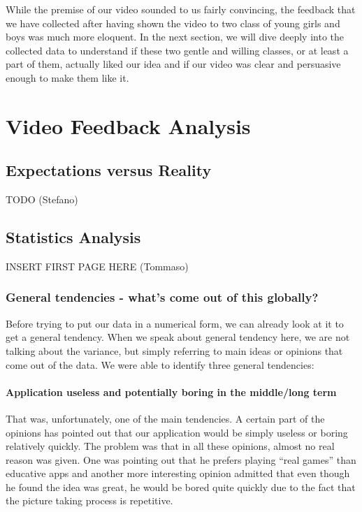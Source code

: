 \documentclass[12pt]{scrartcl}
\begin{document}
	While the premise of our video sounded to us fairly convincing, the feedback that we have collected after having shown the video to two class of young girls and boys was much more eloquent. In the next section, we will dive deeply into the collected data to understand if these two gentle and willing classes, or at least a part of them, actually liked our idea and if our video was clear and persuasive enough to make them like it. 
  
\newpage


\section{Video Feedback Analysis}
	
	
	\subsection{Expectations versus Reality}
	
		
		TODO (Stefano)
	
	\subsection{Statistics Analysis}
	
		
		INSERT FIRST PAGE HERE (Tommaso)
		
		\subsubsection*{General tendencies - what’s come out of this globally?}

			Before trying to put our data in a numerical form, we can already look at it to get a general tendency. When we speak about general tendency here, we are not talking about the variance, but simply referring to main ideas or opinions that come out of the data. We were able to identify three general tendencies:

				\paragraph{Application useless and potentially boring in the middle/long term} 
					That was, unfortunately, one of the main tendencies. A certain part of the opinions has pointed out that our application would be simply useless or boring relatively quickly. The problem was that in all these opinions, almost no real reason was given. One was pointing out that he prefers playing “real games” than educative apps and another more interesting opinion admitted that even though he found the idea was great, he would be bored quite quickly due to the fact that the picture taking process is repetitive.
\end{document}
